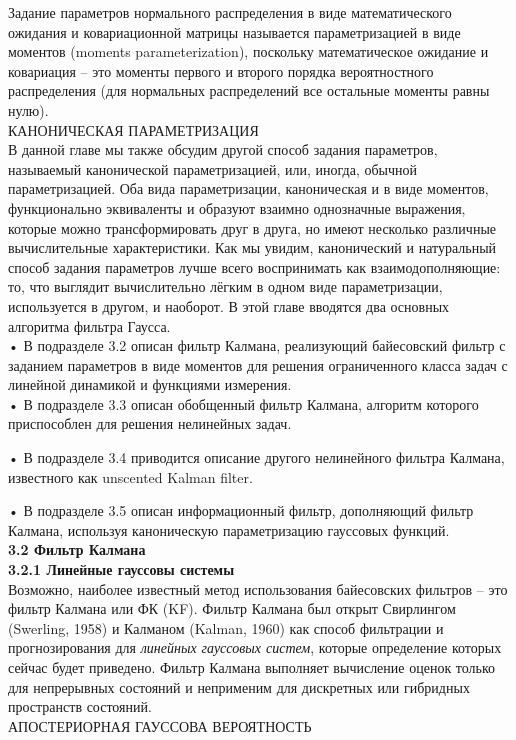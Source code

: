 \documentclass[10pt,a4paper]{article}
\begin{document}
 Задание параметров нормального распределения в виде математического ожидания и ковариационной матрицы называется параметризацией в виде моментов (moments parameterization), поскольку математическое ожидание и ковариация – это моменты первого и второго порядка вероятностного распределения (для нормальных распределений все остальные моменты равны нулю).\\
 КАНОНИЧЕСКАЯ ПАРАМЕТРИЗАЦИЯ\\
 В данной главе мы также обсудим другой способ задания параметров, называемый канонической параметризацией, или, иногда, обычной параметризацией. Оба вида параметризации, каноническая и в виде моментов, функционально эквиваленты и образуют взаимно однозначные выражения, которые можно трансформировать друг в друга, но имеют несколько различные вычислительные характеристики. Как мы увидим, канонический и натуральный способ задания параметров лучше всего воспринимать как взаимодополняющие: то, что выглядит вычислительно лёгким в одном виде параметризации, используется в другом, и наоборот.
 В этой главе вводятся два основных алгоритма фильтра Гаусса.\\
 
 • В подразделе 3.2 описан фильтр Калмана, реализующий байесовский фильтр с заданием параметров в виде моментов для решения ограниченного класса задач с линейной динамикой и функциями измерения.\\
 
 • В подразделе 3.3 описан обобщенный фильтр Калмана, алгоритм которого приспособлен для решения нелинейных задач.
 
 • В подразделе 3.4 приводится описание другого нелинейного фильтра Калмана, известного как unscented Kalman filter.
  
 • В подразделе 3.5 описан информационный фильтр, дополняющий фильтр Калмана, используя каноническую  параметризацию гауссовых функций.\\
 
 \textbf{3.2 Фильтр Калмана}\\
  
 \textbf{3.2.1 Линейные гауссовы системы}\\
 Возможно, наиболее известный метод использования байесовских фильтров – это фильтр Калмана или ФК (KF). Фильтр Калмана был открыт Свирлингом (Swerling, 1958) и Калманом (Kalman, 1960) как способ фильтрации и прогнозирования для \textit{линейных гауссовых систем}, которые определение которых сейчас будет приведено. Фильтр Калмана выполняет вычисление оценок только для непрерывных состояний и неприменим для дискретных или гибридных пространств состояний.\\
 АПОСТЕРИОРНАЯ ГАУССОВА ВЕРОЯТНОСТЬ
  
\end{document}
